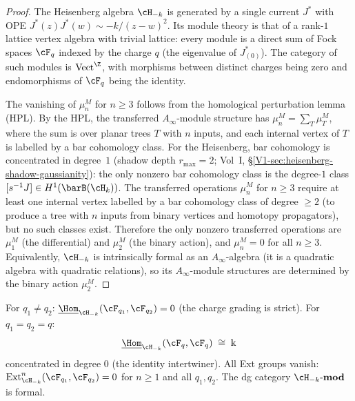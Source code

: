 \begin{proof}
The Heisenberg algebra $\cH_{-k}$ is generated by a single
current $J^*$ with OPE $J^*(z)J^*(w)\sim -k/(z-w)^2$.
Its module theory is that of a rank-$1$ lattice vertex algebra
with trivial lattice: every module is a direct sum of Fock
spaces $\cF_q$ indexed by the charge $q$ (the eigenvalue of
$J^*_{(0)}$). The category of such modules is
$\mathrm{Vect}^\Z$, with morphisms between distinct charges
being zero and endomorphisms of $\cF_q$ being the identity.

The vanishing of $\mu_n^M$ for $n\ge 3$ follows from the
homological perturbation lemma (HPL). By the HPL, the
transferred $A_\infty$-module structure has
$\mu_n^M = \sum_T \mu_T^M$, where the sum is over planar
trees $T$ with $n$ inputs, and each internal vertex of $T$
is labelled by a bar cohomology class. For the Heisenberg,
bar cohomology is concentrated in degree~$1$
(shadow depth $r_{\max}=2$; Vol~I,
\S\ref*{V1-sec:heisenberg-shadow-gaussianity}): the only
nonzero bar cohomology class is the degree-$1$ class
$[s^{-1}J]\in H^1(\barB(\cH_k))$. The transferred
operations $\mu_n^M$ for $n\ge 3$ require at least one
internal vertex labelled by a bar cohomology class of
degree $\ge 2$ (to produce a tree with $n$ inputs from
binary vertices and homotopy propagators), but no such
classes exist. Therefore the only nonzero transferred
operations are $\mu_1^M$ (the differential) and $\mu_2^M$
(the binary action), and $\mu_n^M = 0$ for all $n\ge 3$.
Equivalently, $\cH_{-k}$ is intrinsically formal as an
$A_\infty$-algebra (it is a quadratic algebra with
quadratic relations), so its $A_\infty$-module structures
are determined by the binary action $\mu_2^M$.
\end{proof}

\begin{computation}
For $q_1\ne q_2$:
$\underline{\Hom}_{\cH_{-k}}(\cF_{q_1},\cF_{q_2})=0$
(the charge grading is strict). For $q_1=q_2=q$:
\begin{equation}
\underline{\Hom}_{\cH_{-k}}(\cF_q,\cF_q)
\;\cong\;
\Bbbk
\end{equation}
concentrated in degree $0$ (the identity intertwiner).
All Ext groups vanish:
$\operatorname{Ext}^n_{\cH_{-k}}(\cF_{q_1},\cF_{q_2})=0$
for $n\ge 1$ and all $q_1,q_2$. The dg category
$\cH_{-k}\text{-}\mathbf{mod}$ is formal.
\end{computation}

